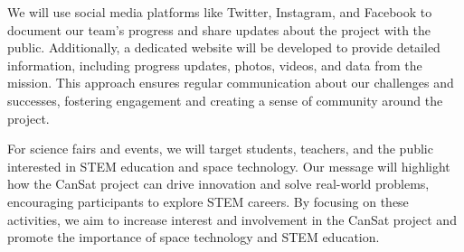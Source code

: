 We will use social media platforms like Twitter, Instagram, and Facebook to document our team's progress and share updates about the project with the public. Additionally, a dedicated website will be developed to provide detailed information, including progress updates, photos, videos, and data from the mission. This approach ensures regular communication about our challenges and successes, fostering engagement and creating a sense of community around the project.

For science fairs and events, we will target students, teachers, and the public interested in STEM education and space technology. Our message will highlight how the CanSat project can drive innovation and solve real-world problems, encouraging participants to explore STEM careers. By focusing on these activities, we aim to increase interest and involvement in the CanSat project and promote the importance of space technology and STEM education.

 




